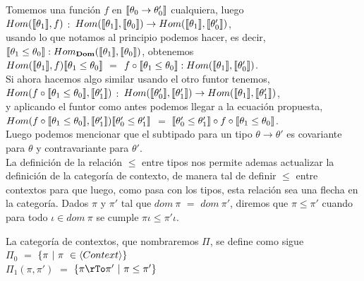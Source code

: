 Tomemos una funci\'on $f$ en $\llbracket \theta_0 \rightarrow \theta_0' \rrbracket$ cualquiera, luego \\

$Hom(\llbracket \theta_1 \rrbracket, f)$ $:$ 
$Hom(\llbracket \theta_1 \rrbracket, \llbracket \theta_0 \rrbracket) \rightarrow Hom(\llbracket \theta_1 \rrbracket, \llbracket \theta_0' \rrbracket)$,\\

usando lo que notamos al principio podemos hacer, es decir, $\llbracket \theta_1 \leq \theta_0 \rrbracket : Hom_{\textbf{Dom}}(\llbracket \theta_1 \rrbracket,\llbracket \theta_0 \rrbracket)$, obtenemos \\

$Hom(\llbracket \theta_1 \rrbracket, f) \llbracket \theta_1 \leq \theta_0 \rrbracket$ $=$ $f \circ \llbracket \theta_1 \leq \theta_0 \rrbracket : 
Hom(\llbracket \theta_1 \rrbracket, \llbracket \theta_0' \rrbracket)$.\\

Si ahora hacemos algo similar usando el otro funtor tenemos,\\

$Hom(f \circ \llbracket \theta_1 \leq \theta_0 \rrbracket, \llbracket \theta_1' \rrbracket)$ $:$ 
$Hom(\llbracket \theta_0' \rrbracket, \llbracket \theta_1' \rrbracket) \rightarrow Hom(\llbracket \theta_1 \rrbracket, \llbracket \theta_1' \rrbracket)$,\\

y aplicando el funtor como antes podemos llegar a la ecuación propuesta,\\

$Hom(f \circ \llbracket \theta_1 \leq \theta_0 \rrbracket, \llbracket \theta_1' \rrbracket)\llbracket \theta_0' \leq \theta_1' \rrbracket$ $=$
$\llbracket \theta_0' \leq \theta_1' \rrbracket \circ f \circ \llbracket \theta_1 \leq \theta_0 \rrbracket$.\\

Luego podemos mencionar que el subtipado para un tipo $\theta \rightarrow \theta'$ es covariante
para $\theta$ y contravariante para $\theta'$.\\

La definici\'on de la relaci\'on $\leq$ entre tipos nos permite ademas actualizar 
la definici\'on de la categor\'ia de contexto, de manera tal de definir $\leq$ entre
contextos para que luego, como pasa con los tipos, esta relaci\'on sea una flecha 
en la categor\'ia. Dados $\pi$ y $\pi'$ tal que $dom \ \pi$ $=$ $dom \ \pi'$, diremos
que $\pi \leq \pi'$ cuando para todo $\iota \in dom \ \pi$ se cumple $\pi \iota \leq \pi' \iota$.\\

\begin{definition}\label{lambdal:contextcategory}
La categor\'ia de contextos, que nombraremos $\Pi$, se define como sigue\\

$\Pi_0$ $=$ $\{\pi \ | \ \pi \ \in \langle Context \rangle \}$\\
\indent
$\Pi_1(\pi,\pi')$ $=$ $\{ \pi \rTo \pi' \ | \ \pi \leq \pi' \}$

\end{definition}

